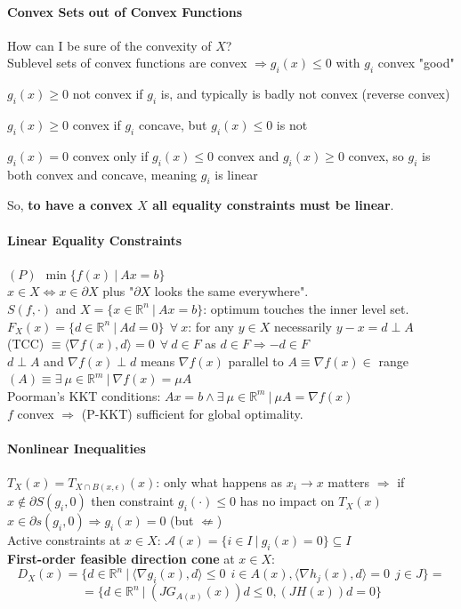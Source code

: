 \documentclass[10pt]{report}
\begin{document}
\paragraph{Convex Sets out of Convex Functions} How can I be sure of the convexity of $X$?\\
Sublevel sets of convex functions are convex $\Rightarrow g_i(x)\leq 0$ with $g_i$ convex "good"\begin{list}{}{}
	\item $g_i(x) \geq 0$ not convex if $g_i$ is, and typically is badly not convex (reverse convex)
	\item $g_i(x) \geq 0$ convex if $g_i$ concave, but $g_i(x) \leq 0$ is not
	\item $g_i(x) = 0$ convex only if $g_i(x)\leq 0$ convex and $g_i(x) \geq 0$ convex, so $g_i$ is both convex and concave, meaning $g_i$ is linear
\end{list}
So, \textbf{to have a convex $X$ all equality constraints must be linear}.
\paragraph{Linear Equality Constraints} $(P)\:\:\min\{f(x)\:|\:Ax=b\}$\\
$x\in X \Leftrightarrow x\in \partial X$ plus "$\partial X$ looks the same everywhere".\\
$S(f,\cdot)$ and $X=\{x\in \mathbb{R}^n\:|\:Ax=b\}$: optimum touches the inner level set.\\
$F_X(x) = \{d\in \mathbb{R}^n\:|\:Ad=0\}\:\:\forall\:x$: for any $y\in X$ necessarily $y-x = d\perp A$\\
(TCC) $\equiv \langle\nabla f(x),d\rangle = 0\:\:\forall\:d\in F$ as $d\in F\Rightarrow -d\in F$\\
$d\perp A$ and $\nabla f(x)\perp d$ means $\nabla f(x)$ parallel to $A\equiv\nabla f(x)\in $ range$(A)\equiv\exists\:\mu\in \mathbb{R}^m\:|\:\nabla f(x) = \mu A$\\
Poorman's KKT conditions: $Ax = b \wedge \exists\:\mu\in \mathbb{R}^m\:|\:\mu A = \nabla f(x)$\\
$f$ convex $\Rightarrow$ (P-KKT) sufficient for global optimality.
\paragraph{Nonlinear Inequalities} $T_X(x) = T_{X\cap B(x,\epsilon)}(x)$: only what happens as $x_i\rightarrow x$ matters $\Rightarrow$ if $x\not\in \partial S(g_i,0)$ then constraint $g_i(\cdot)\leq 0$ has no impact on $T_X(x)$\\
$x\in\partial s(g_i,0)\Rightarrow g_i(x)=0$ (but $\not\Leftarrow$)\\
Active constraints at $x\in X$: $\mathscr{A}(x) = \{i\in I\:|\:g_i(x)=0\}\subseteq I$\\
\textbf{First-order feasible direction cone} at $x\in X$: $$D_X(x) = \{d\in \mathbb{R}^n\:|\:\langle\nabla g_i(x), d\rangle\leq 0\:\:i\in A(x),\langle\nabla h_j(x),d\rangle = 0\:\:j\in J\}=$$ $$=\{d\in \mathbb{R}^n\:|\:(JG_{A(x)}(x))d\leq 0, (JH(x))d=0\}$$
\end{document}
